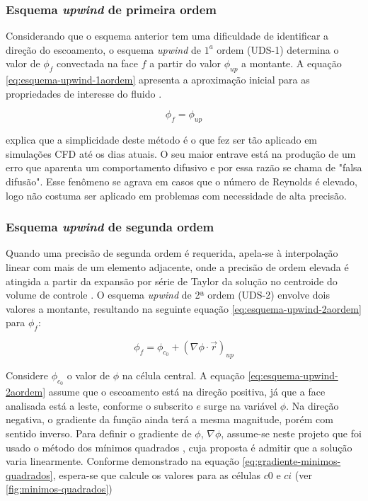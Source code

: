 \subsubsection{Esquema \textit{upwind} de primeira ordem}

Considerando que o esquema anterior tem uma dificuldade de identificar a direção do escoamento, o esquema \textit{upwind} de $1^{a}$ ordem (UDS-1) determina o valor de $\phi_f$ convectada na face $f$ a partir do valor $\phi_{up}$ a montante. A equação \ref{eq:esquema-upwind-1aordem} apresenta a aproximação inicial para as propriedades de interesse do fluido \cite{Rezende2009}.

\begin{equation}\label{eq:esquema-upwind-1aordem}
	\phi_f = \phi_{up}
\end{equation}

\citeauthor{malalasekera2007} explica que a simplicidade deste método é o que fez ser tão aplicado em simulações CFD até os dias atuais. O seu maior entrave está na produção de um erro que aparenta um comportamento difusivo e por essa razão se chama de "falsa difusão". Esse fenômeno se agrava em casos que o número de Reynolds é elevado, logo não costuma ser aplicado em problemas com necessidade de alta precisão.

\subsubsection{Esquema \textit{upwind} de segunda ordem}

Quando uma precisão de segunda ordem é requerida, apela-se à interpolação linear com mais de um elemento adjacente, onde a precisão de ordem elevada é atingida a partir da expansão por série de Taylor da solução no centroide do volume de controle \cite{Rezende2009}. O esquema \textit{upwind} de 2ª ordem (UDS-2) envolve dois valores a montante, resultando na seguinte equação \ref{eq:esquema-upwind-2aordem} para $\phi_f$:

\begin{equation} \label{eq:esquema-upwind-2aordem}
    \phi_f = \phi_{c_0} + \left(\nabla\phi\cdot\overrightarrow{r}\right)_{up}
\end{equation}

Considere $\phi_{c_0}$ o valor de $\phi$ na célula central. A equação \ref{eq:esquema-upwind-2aordem} assume que o escoamento está na direção positiva, já que a face analisada está a leste, conforme o subscrito $e$ surge na variável $\phi$. Na direção negativa, o gradiente da função ainda terá a mesma magnitude, porém com sentido inverso. Para definir o gradiente de $\phi$, $\nabla\phi$, assume-se neste projeto que foi usado o método dos mínimos quadrados \cite{Anderson1994}, cuja proposta é admitir que a solução varia linearmente. Conforme demonstrado na equação \ref{eq:gradiente-minimos-quadrados}, espera-se que calcule os valores para as células $c0$ e $ci$ (ver \autoref{fig:minimos-quadrados})

